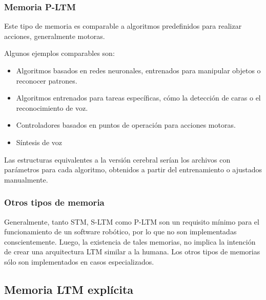 \subsubsection{Memoria P-LTM}

Este tipo de memoria es comparable a algoritmos predefinidos para realizar acciones, generalmente motoras. 

Algunos ejemplos comparables son: 
\begin{itemize}[topsep=0pt]
\setlength\itemsep{0.2em}
\item Algoritmos basados en redes neuronales, entrenados para manipular objetos o reconocer patrones.
\item Algoritmos entrenados para tareas espec\'ificas, c\'omo la detecci\'on de caras o el reconocimiento de voz.
\item Controladores basados en puntos de operaci\'on para acciones motoras.
\item S\'intesis de voz
\end{itemize}

Las estructuras equivalentes a la versi\'on cerebral ser\'ian los archivos con par\'ametros para cada algoritmo, obtenidos a partir del entrenamiento o ajustados manualmente.


\subsubsection{Otros tipos de memoria}

Generalmente, tanto STM, S-LTM como P-LTM son un requisito m\'inimo para el funcionamiento de un software rob\'otico, por lo que no son implementadas conscientemente. Luego, la existencia de tales memorias, no implica la intenci\'on de crear una arquitectura LTM similar a la humana. Los otros tipos de memorias s\'olo son implementados en casos especializados.



\subsection{Memoria LTM expl\'icita}\label{sec:ltm_exp}




